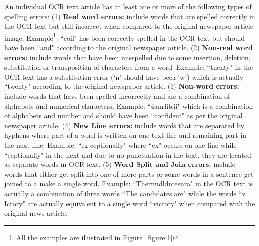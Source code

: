 \documentclass[12pt]{article}
\begin{document}
\noindent An individual OCR text article has at least one or more of the following types of spelling errors: (1) \textbf{Real word errors: }include words that are spelled correctly in the OCR text but still incorrect when compared to the original newspaper article image. Example\footnote{All the examples are illustrated in Figure~\ref{figure:1}}: ``coil"  has been correctly spelled in the OCR text  but should have been ``and" according to the original newspaper article. (2) \textbf{Non-real word errors: }include words that have been misspelled due to some insertion, deletion, substitution or transposition of characters from a word. Example: ``tnenty" in the OCR text has a substitution error (`n' should have been `w') which is actually ``twenty" according to the original newspaper article. (3) \textbf{Non-word errors: }include words that have been spelled incorrectly and are a combination of alphabets and numerical characters. Example:  ``4anrliteii" which is a combination of alphabets and number and should have been ``confident" as per the original newspaper article. (4) \textbf{New Line errors: }include words that are separated by hyphens where part of a word is written on one text line and remaining part in the next line. Example: ``ex-ceptionally" where ``ex" occurs on one line while ``ceptionally" in the next and due to no punctuation in the text, they are treated as separate words in OCR text. (5) \textbf{Word Split and Join errors: }include words that either get split into one of more parts or some words in a sentence get joined to a make a single word. Example: ``Thernndldntesnra" in the OCR text is actually a combination of three words ``The candidates are" while the words ``v Icrory" are actually equivalent to a single word ``victory" when compared with the original news article.
\end{document}
